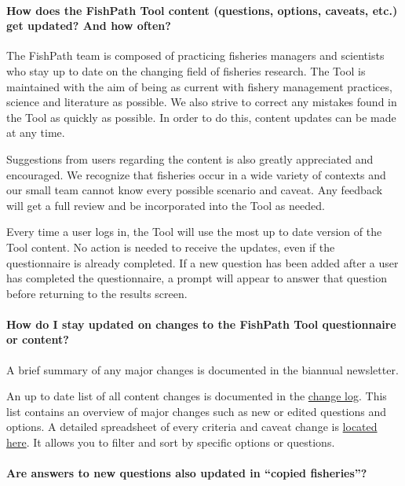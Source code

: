 \documentclass[
  11pt,
]{book}
\begin{document}
\hypertarget{faq-content-updates}{%
\paragraph{How does the FishPath Tool content (questions, options, caveats, etc.) get updated? And how often?}\label{faq-content-updates}}

The FishPath team is composed of practicing fisheries managers and scientists who stay up to date on the changing field of fisheries research. The Tool is maintained with the aim of being as current with fishery management practices, science and literature as possible. We also strive to correct any mistakes found in the Tool as quickly as possible. In order to do this, content updates can be made at any time.

Suggestions from users regarding the content is also greatly appreciated and encouraged. We recognize that fisheries occur in a wide variety of contexts and our small team cannot know every possible scenario and caveat. Any feedback will get a full review and be incorporated into the Tool as needed.

Every time a user logs in, the Tool will use the most up to date version of the Tool content. No action is needed to receive the updates, even if the questionnaire is already completed. If a new question has been added after a user has completed the questionnaire, a prompt will appear to answer that question before returning to the results screen.

\hypertarget{faq-stay-updated}{%
\paragraph{How do I stay updated on changes to the FishPath Tool questionnaire or content?}\label{faq-stay-updated}}

A brief summary of any major changes is documented in the biannual newsletter.

An up to date list of all content changes is documented in the \href{https://github.com/FishPath/FishPath-Tool-User-Guide/blob/master/Major\%20Content\%20Updates.md}{change log}. This list contains an overview of major changes such as new or edited questions and options. A detailed spreadsheet of every criteria and caveat change is \href{https://docs.google.com/spreadsheets/d/1HPlUvI6XuvXtYdFk5bpOsG4JR1fdM0D58KO5mBs0fyE/edit?usp=sharing}{located here}. It allows you to filter and sort by specific options or questions.

\hypertarget{faq-copy-fisheries}{%
\paragraph{Are answers to new questions also updated in ``copied fisheries''?}\label{faq-copy-fisheries}}
\end{document}
